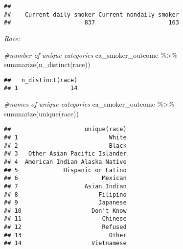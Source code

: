 \documentclass[
]{article}
\newenvironment{Shaded}{\begin{snugshade}}{\end{snugshade}}
\newcommand{\CommentTok}[1]{\textcolor[rgb]{0.56,0.35,0.01}{\textit{#1}}}
\newcommand{\FunctionTok}[1]{\textcolor[rgb]{0.00,0.00,0.00}{#1}}
\newcommand{\NormalTok}[1]{#1}
\newcommand{\SpecialCharTok}[1]{\textcolor[rgb]{0.00,0.00,0.00}{#1}}
\begin{document}
\begin{verbatim}
## 
##    Current daily smoker Current nondaily smoker 
##                     837                     163
\end{verbatim}

\emph{Race:}

\begin{Shaded}
\begin{Highlighting}[]
\CommentTok{\#number of unique categories }
\NormalTok{ca\_smoker\_outcome }\SpecialCharTok{\%\textgreater{}\%} \FunctionTok{summarize}\NormalTok{(}\FunctionTok{n\_distinct}\NormalTok{(race))}
\end{Highlighting}
\end{Shaded}

\begin{verbatim}
##   n_distinct(race)
## 1               14
\end{verbatim}

\begin{Shaded}
\begin{Highlighting}[]
\CommentTok{\#names of unique categories }
\NormalTok{ca\_smoker\_outcome }\SpecialCharTok{\%\textgreater{}\%} \FunctionTok{summarize}\NormalTok{(}\FunctionTok{unique}\NormalTok{(race))}
\end{Highlighting}
\end{Shaded}

\begin{verbatim}
##                     unique(race)
## 1                          White
## 2                          Black
## 3   Other Asian Pacific Islander
## 4  American Indian Alaska Native
## 5             Hispanic or Latino
## 6                        Mexican
## 7                   Asian Indian
## 8                       Filipino
## 9                       Japanese
## 10                    Don't Know
## 11                       Chinese
## 12                       Refused
## 13                         Other
## 14                    Vietnamese
\end{verbatim}

\begin{Shaded}
\end{Shaded}
\end{document}
